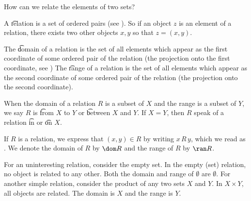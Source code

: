 

How can we relate the elements of two sets?


A \t{relation} is a set of ordered pairs (see ).
So if an object $z$ is an element of a relation, there exists two other objects $x, y$ so that $z = (x, y)$.

The \t{domain} of a relation is the set of all elements which appear as the first coordinate of some ordered pair of the relation (the projection onto the first coordinate, see )
The \t{range} of a relation is the set of all elements which appear as the second coordinate of some ordered pair of the relation (the projection onto the second coordinate).

When the domain of a relation $R$ is a subset of $X$ and the range is a subset of $Y$, we say $R$ is \t{from $X$ to $Y$} or \t{between} $X$ and $Y$.
If $X = Y$, then $R$ speak of a relation \t{in} or \t{on} $X$.

%


If $R$ is a relation, we express that $(x, y) \in R$ by writing $x\,R\,y$, which we read as .
We denote the domain of $R$ by $\dom R$ and the range of $R$ by $\ran R$.


For an uninteresting relation, consider the empty set.
In the empty (set) relation, no object is related to any other.
Both the domain and range of $\emptyset$ are $\emptyset$.
For another simple relation, consider the product of any two sets $X$ and $Y$.
In $X \times Y$, all objects are related.
The domain is $X$ and the range is $Y$.

